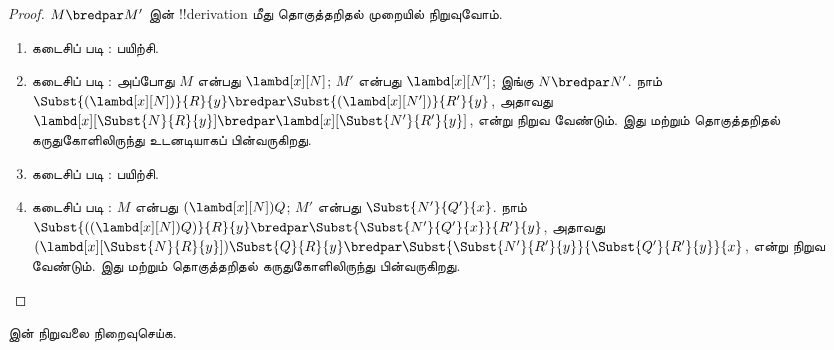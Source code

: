 \documentclass[../../../include/open-logic-section]{subfiles}
\begin{document}
\begin{proof}
  $M \bredpar M'$ இன் !!{derivation} மீது தொகுத்தறிதல் முறையில் நிறுவுவோம்.
  \begin{enumerate}
    \item கடைசிப் படி : பயிற்சி.
    \item கடைசிப் படி : அப்போது $M$ என்பது
      $\lambd[x][N]$; $M'$ என்பது $\lambd[x][N']$; இங்கு
      $N \bredpar N'$. நாம்
      $\Subst{(\lambd[x][N])}{R}{y} \bredpar
      \Subst{(\lambd[x][N'])}{R'}{y}$, அதாவது
      $\lambd[x][\Subst{N}{R}{y}] \bredpar
      \lambd[x][\Subst{N'}{R'}{y}]$, என்று நிறுவ வேண்டும்.
      இது  மற்றும் தொகுத்தறிதல் கருதுகோளிலிருந்து
      உடனடியாகப் பின்வருகிறது.
    \item கடைசிப் படி : பயிற்சி.
    \item கடைசிப் படி : $M$ என்பது
      $(\lambd[x][N])Q$; $M'$ என்பது $\Subst{N'}{Q'}{x}$. நாம்
      $\Subst{((\lambd[x][N])Q)}{R}{y} \bredpar
      \Subst{\Subst{N'}{Q'}{x}}{R'}{y}$, அதாவது
      $(\lambd[x][\Subst{N}{R}{y}])\Subst{Q}{R}{y} \bredpar
      \Subst{\Subst{N'}{R'}{y}}{\Subst{Q'}{R'}{y}}{x}$, என்று நிறுவ வேண்டும்.
      இது  மற்றும் தொகுத்தறிதல் கருதுகோளிலிருந்து
      பின்வருகிறது.
  \end{enumerate}
\end{proof}

\begin{prob}
   இன் நிறுவலை நிறைவுசெய்க.
\end{prob}
\end{document}

